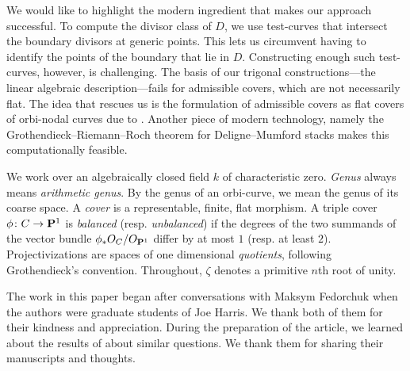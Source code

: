 \documentclass{amsart}
\renewcommand {\P}{{\bf P}}
\newcommand {\from}{{\colon}}
\begin{document}
We would like to highlight the modern ingredient that makes
our approach successful. To compute the divisor class of $D$, we use
test-curves that intersect the boundary divisors at generic
points. This lets us circumvent having to identify the points of the
boundary that lie in $D$. Constructing enough such test-curves,
however, is challenging. The basis of our trigonal constructions---the
linear algebraic description---fails for admissible covers, which are
not necessarily flat. The idea that rescues us is the formulation of
admissible covers as flat covers of orbi-nodal curves due to
\citet*{acv:03}. Another piece of modern technology, namely the
Grothendieck--Riemann--Roch theorem for Deligne--Mumford stacks
\citep{edidin12:_rieman_roch_delig_mumfor} makes this computationally
feasible.

We work over an algebraically closed field $k$ of characteristic
zero. \emph{Genus} always means \emph{arithmetic genus}. By the genus
of an orbi-curve, we mean the genus of its coarse space. A
\emph{cover} is a representable, finite, flat morphism. A triple cover
$\phi \from C \to \P^1$ is \emph{balanced} (resp. \emph{unbalanced})
if the degrees of the two summands of the vector bundle $\phi_* O_C /
O_{\P^1}$ differ by at most $1$ (resp. at least
$2$). Projectivizations are spaces of one dimensional
\emph{quotients}, following Grothendieck's convention. Throughout,
$\zeta$ denotes a primitive $n$th root of unity.

The work in this paper began after conversations with Maksym Fedorchuk
when the authors were graduate students of Joe Harris. We thank both
of them for their kindness and appreciation. During the preparation of
the article, we learned about the results of \citet{beorchia12:_m}
about similar questions. We thank them for sharing their manuscripts
and thoughts.
\end{document}

